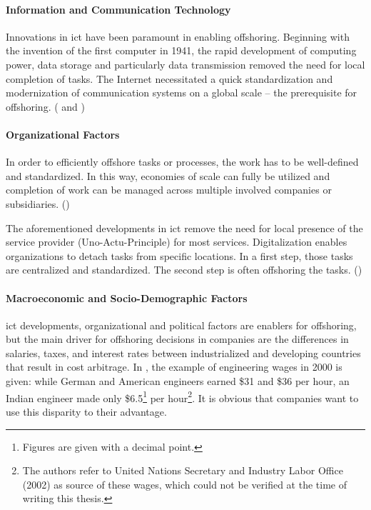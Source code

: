 \paragraph{Information and Communication Technology}
Innovations in \gls{ict} have been paramount in enabling offshoring. Beginning with the invention of the first computer in 1941, the rapid development of computing power, data storage and particularly data transmission removed the need for local completion of tasks. The Internet necessitated a quick standardization and modernization of communication systems on a global scale -- the prerequisite for offshoring. (\cite[pp. 9f]{Hutzschenreuter.2007} and \cite[p. 93]{Jahns.2007})

\paragraph{Organizational Factors}
In order to efficiently offshore tasks or processes, the work has to be well-defined and standardized. In this way, economies of scale can fully be utilized and completion of work can be managed across multiple involved companies or subsidiaries. (\cite[p. 11]{Hutzschenreuter.2007})

The aforementioned developments in \gls{ict} remove the need for local presence of the service provider (Uno-Actu-Principle) for most services. Digitalization enables organizations to detach tasks from specific locations. In a first step, those tasks are centralized and standardized. The second step is often offshoring the tasks. (\cite[pp. 12f]{Hutzschenreuter.2007})

\paragraph{Macroeconomic and Socio-Demographic Factors}
\Gls{ict} developments, organizational and political factors are enablers for offshoring, but the main driver for offshoring decisions in companies are the differences in salaries, taxes, and interest rates between industrialized and developing countries that result in cost arbitrage. In \cite[p. 89]{Jahns.2007}, the example of engineering wages in 2000 is given: while German and American engineers earned \$31 and \$36 per hour, an Indian engineer made only \$6.5\footnote{Figures are given with a decimal point.} per hour\footnote{The authors refer to United Nations Secretary and Industry Labor Office (2002) as source of these wages, which could not be verified at the time of writing this thesis.}. It is obvious that companies want to use this disparity to their advantage.

